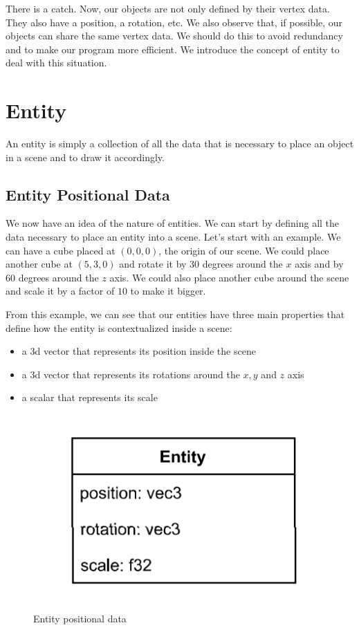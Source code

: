 There is a catch.
Now, our objects are not only defined by their vertex data.
They also have a position, a rotation, etc.
We also observe that, if possible, our objects can share the same vertex data.
We should do this to avoid redundancy and to make our program more efficient.
We introduce the concept of entity to deal with this situation.

\section{Entity}

An entity is simply a collection of all the data that is necessary to place
an object in a scene and to draw it accordingly.

\subsection{Entity Positional Data}

We now have an idea of the nature of entities.
We can start by defining all the data necessary
to place an entity into a scene.
Let's start with an example.
We can have a cube placed at $(0, 0, 0)$, the origin of our scene.
We could place another cube at $(5, 3, 0)$ and rotate it by $30$
degrees around the $x$ axis and by $60$ degrees around the $z$ axis.
We could also place another cube around the scene and scale it by a factor
of $10$ to make it bigger.

From this example, we can see that our entities have three main properties
that define how the entity is contextualized inside a scene:
\begin{itemize}
    \item a 3d vector that represents its position inside the scene
    \item a 3d vector that represents its rotations around the $x, y$ and $z$ axis
    \item a scalar that represents its scale
\end{itemize}

\begin{figure}[ht]
    \centering
    \includegraphics[scale=0.50]{images/ChScene/EntityPositionalData.png}
    \caption{Entity positional data}
    \label{fig::EntityPositionalData}
\end{figure}

